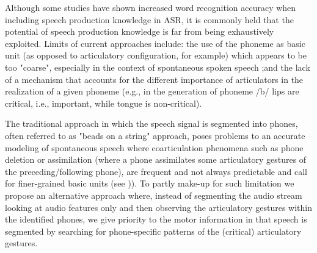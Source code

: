 Although some studies have shown increased word recognition accuracy when including speech production knowledge in ASR, it is commonly held that the potential of speech production knowledge is far from being exhaustively exploited. Limits of current approaches include: the use of the phoneme as basic unit (as opposed to articulatory configuration, for example) which appears to be too "coarse", especially in the context of spontaneous spoken speech 
;and  the lack of a mechanism that accounts for the different importance of articulators in the realization of a given phoneme (e.g., in the generation of phoneme /b/ lips are critical, i.e., important, while tongue is non-critical).

The traditional approach in which the speech signal is segmented into phones, often referred to as "beads on a string" approach, poses problems to an accurate modeling of spontaneous speech where coarticulation phenomena such as phone deletion or assimilation (where a phone assimilates some articulatory gestures of the preceding/following phone), are frequent and not always predictable and call for finer-grained basic units (see \cite{ostendorf})). To partly make-up for such limitation we propose an alternative approach where, instead of segmenting the audio stream looking at audio features only and then observing the articulatory gestures within the identified phones, we give priority to the motor information in that speech is segmented by searching for phone-specific patterns of the (critical) articulatory gestures.



